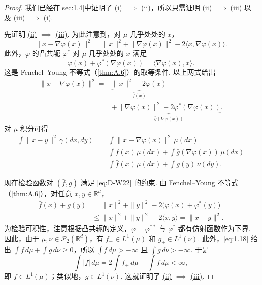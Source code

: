 \begin{proof}
我们已经在\autoref{sec:1.4}中证明了
\hyperref[item:1.14.i]{(i)} $\implies$ \hyperref[item:1.14.ii]{(ii)}，所以只需证明
\hyperref[item:1.14.ii]{(ii)} $\implies$ \hyperref[item:1.14.iii]{(iii)}
以及 \hyperref[item:1.14.iii]{(iii)} $\implies$ \hyperref[item:1.14.i]{(i)}.

先证明 \hyperref[item:1.14.ii]{(ii)} $\implies$ \hyperref[item:1.14.iii]{(iii)}. 为此注意到，对 $\mu$ 几乎处处的 $x$，
$$
\|x-\nabla\varphi(x)\|^2
=\|x\|^2+\|\nabla\varphi(x)\|^2-2\langle x,\nabla\varphi(x)\rangle.
$$
此外，$\varphi$ 的凸共轭 $\varphi^*$ 对 $\mu$ 几乎处处的 $x$ 满足
$$
\varphi(x)+\varphi^*(\nabla\varphi(x))=\langle\nabla\varphi(x),x\rangle.
$$
这是 Fenchel--Young 不等式（\autoref{thm:A.6}）的取等条件. 以上两式给出
$$
\begin{aligned}
\|x-\nabla\varphi(x)\|^2
={}&\underbrace{\|x\|^2-2\varphi(x)}_{\bar f(x)}\\
&+\underbrace{\|\nabla\varphi(x)\|^2-2\varphi^*(\nabla\varphi(x))}_{\bar g(\nabla\varphi(x))}.
\end{aligned}
$$
对 $\mu$ 积分可得
\begin{equation}\label{eq:1.18}
\begin{aligned}
\int\|x-y\|^2\,\bar\gamma(dx,dy)
&=\int\|x-\nabla\varphi(x)\|^2\,\mu(dx)\\
&=\int\bar f(x)\,\mu(dx)+\int\bar g(\nabla\varphi(x))\,\mu(dx)\\
&=\int\bar f(x)\,\mu(dx)+\int\bar g(y)\,\nu(dy).
\end{aligned}
\end{equation}

现在检验函数对 $(\bar f,\bar g)$ 满足 \eqref{eq:D-W22} 的约束. 由 Fenchel--Young 不等式（\autoref{thm:A.6}），对任意 $x,y\in\mathbb{R}^d$，
\begin{equation}\label{eq:1.19}
\begin{aligned}
\bar f(x)+\bar g(y)
&=\|x\|^2+\|y\|^2-2\bigl(\varphi(x)+\varphi^*(y)\bigr)\\
&\leq\|x\|^2+\|y\|^2-2\langle x,y\rangle=\|x-y\|^2.
\end{aligned}
\end{equation}
为检验可积性，注意根据凸共轭的定义，$\varphi=\varphi^{**}$ 与 $\varphi^*$ 都有仿射函数作为下界. 因此，由于 $\mu,\nu\in\mathcal{P}_2(\mathbb{R}^d)$，有 $f_+\in L^1(\mu)$ 和 $g_+\in L^1(\nu)$. 此外，\eqref{eq:1.18} 给出 $\int f\,d\mu+\int g\,d\nu\geq0$，所以 $\int f\,d\mu>-\infty$ 且 $\int g\,d\nu>-\infty$. 于是
$$
\int|f|\,d\mu=2\int f_+\,d\mu-\int f\,d\mu<\infty,
$$
即 $f\in L^1(\mu)$；类似地，$g\in L^1(\nu)$. 这就证明了
\hyperref[item:1.14.ii]{(ii)} $\implies$ \hyperref[item:1.14.iii]{(iii)}.


\end{proof}

